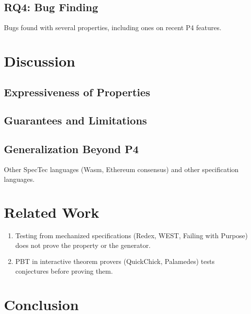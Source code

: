 \documentclass[11pt,a4paper]{article}
\newcommand{\desc}[1]{{\small #1\par}}
\begin{document}
\subsection{RQ4: Bug Finding}
\desc{Bugs found with several properties, including ones on recent P4 features.}

\section{Discussion}
\subsection{Expressiveness of Properties}
\subsection{Guarantees and Limitations}
\subsection{Generalization Beyond P4}
\desc{Other SpecTec languages (Wasm, Ethereum consensus) and other specification languages.}

\section{Related Work}
\begin{enumerate}\small
  \item Testing from mechanized specifications (Redex, WEST, Failing with Purpose) does not prove the property or the generator.
  \item PBT in interactive theorem provers (QuickChick, Palamedes) tests conjectures before proving them.
\end{enumerate}

\section{Conclusion}
\end{document}
